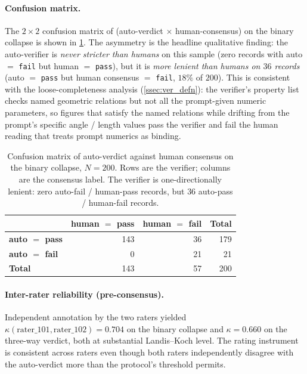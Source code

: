 \paragraph{Confusion matrix.}
The $2{\times}2$ confusion matrix of (auto-verdict $\times$ human-consensus) on the binary collapse is shown in \cref{tab:human_confusion}.
The asymmetry is the headline qualitative finding:
the auto-verifier is \emph{never stricter than humans} on this sample (zero records with auto $=$ \texttt{fail} but human $=$ \texttt{pass}), but it is \emph{more lenient than humans on $36$ records} (auto $=$ \texttt{pass} but human consensus $=$ \texttt{fail}, $18\%$ of $200$).
This is consistent with the loose-completeness analysis (\cref{ssec:ver_defn}): the verifier's property list checks named geometric relations but not all the prompt-given numeric parameters, so figures that satisfy the named relations while drifting from the prompt's specific angle / length values pass the verifier and fail the human reading that treats prompt numerics as binding.

\begin{table}[t]
\caption{Confusion matrix of auto-verdict against human consensus on the binary collapse, $N{=}200$. Rows are the verifier; columns are the consensus label. The verifier is one-directionally lenient: zero auto-fail / human-pass records, but $36$ auto-pass / human-fail records.}
\label{tab:human_confusion}
\centering
\small
\begin{tabular}{lrrr}
\toprule
 & \textbf{human $=$ pass} & \textbf{human $=$ fail} & \textbf{Total} \\
\midrule
\textbf{auto $=$ pass} & 143 & 36 & 179 \\
\textbf{auto $=$ fail} & 0 & 21 & 21 \\
\midrule
\textbf{Total} & 143 & 57 & 200 \\
\bottomrule
\end{tabular}
\end{table}

\paragraph{Inter-rater reliability (pre-consensus).}
Independent annotation by the two raters yielded $\kappa(\text{rater\_101}, \text{rater\_102}) = 0.704$ on the binary collapse and $\kappa = 0.660$ on the three-way verdict, both at substantial Landis--Koch level.
The rating instrument is consistent across raters even though both raters independently disagree with the auto-verdict more than the protocol's threshold permits.

